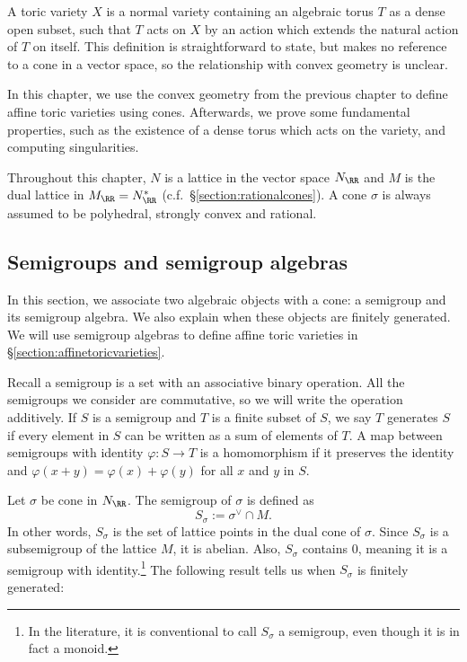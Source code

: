 \documentclass[12pt]{amsart}
\theoremstyle{plain}
\theoremstyle{definition}
\begin{document}
A toric variety $X$ is a normal variety containing an algebraic torus $T$ as a dense open subset, such that $T$ acts on $X$ by an action which extends the natural action of $T$ on itself.
This definition is straightforward to state, but makes no reference to a cone in a vector space, so the relationship with convex geometry is unclear.

In this chapter, we use the convex geometry from the previous chapter to define affine toric varieties using cones.
Afterwards, we prove some fundamental properties, such as the existence of a dense torus which acts on the variety, and computing singularities.

Throughout this chapter, $N$ is a lattice in the vector space $N_\RR$ and $M$ is the dual lattice in $M_\RR = N_\RR^*$ (c.f.\ \S \ref{section:rationalcones}).
A cone $\sigma$ is always assumed to be polyhedral, strongly convex and rational.






\subsection{Semigroups and semigroup algebras}
In this section, we associate two algebraic objects with a cone: a semigroup and its semigroup algebra.
We also explain when these objects are finitely generated.
We will use semigroup algebras to define affine toric varieties in \S \ref{section:affinetoricvarieties}.

Recall a semigroup is a set with an associative binary operation.
All the semigroups we consider are commutative, so we will write the operation additively.
If $S$ is a semigroup and $T$ is a finite subset of $S$, we say $T$ generates $S$ if every element in $S$ can be written as a sum of elements of $T$.
A map between semigroups with identity $\varphi : S \to T$ is a homomorphism if it preserves the identity and $\varphi(x + y) = \varphi(x) + \varphi(y)$ for all $x$ and $y$ in $S$.

Let $\sigma$ be cone in $N_\RR$.
The semigroup of $\sigma$ is defined as
$$S_\sigma := \sigma^\vee \cap M.$$
In other words, $S_\sigma$ is the set of lattice points in the dual cone of $\sigma$.
Since $S_\sigma$ is a subsemigroup of the lattice $M$, it is abelian.
Also, $S_\sigma$ contains $0$, meaning it is a semigroup with identity.\footnote{In the literature, it is conventional to call $S_\sigma$ a semigroup, even though it is in fact a monoid.}
The following result tells us when $S_\sigma$ is finitely generated:
\end{document}

